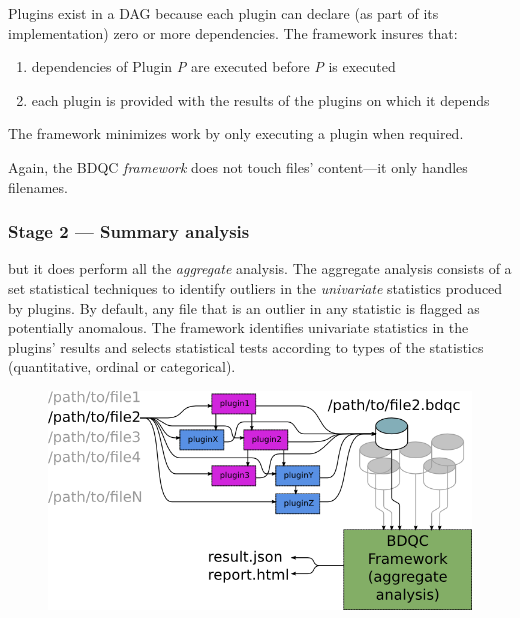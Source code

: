 \documentclass {article}
\begin{document}
Plugins exist in a DAG because each plugin can declare (as part of its
implementation) zero or more dependencies. The framework insures that:
\begin{enumerate}
\item dependencies of Plugin \emph{P} are executed before \emph{P} is executed
\item each plugin is provided with the results of the plugins on which it
	depends
\end{enumerate}

The framework minimizes work by only executing a plugin when required.

Again, the BDQC \emph{framework} does not touch files' content---it only handles
filenames.
\subsubsection{Stage 2 --- Summary analysis}
but it does perform all the \emph{aggregate} analysis.
The aggregate analysis consists of a set statistical techniques to
identify outliers in the \emph{univariate} statistics produced by plugins.
By default, any file that is an outlier in any statistic is flagged as
potentially anomalous.
The framework identifies univariate statistics in the plugins' results
and selects statistical tests according to types of the statistics
(quantitative, ordinal or categorical).


{\centering
\begin{figure}[h]
\includegraphics[scale=0.8]{dataflow}
\end{figure}
}
\end{document}
